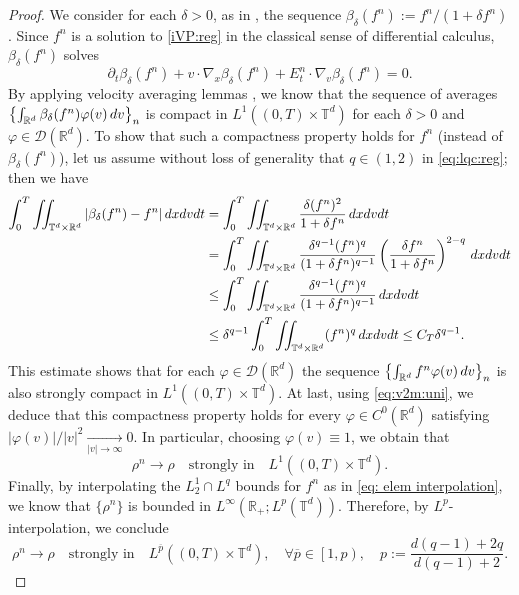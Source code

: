 \documentclass[11pt,reqno,a4paper]{amsart}
\newcommand{\R}{\mathbb{R}}
\newcommand{\p}{\partial}
\newcommand{\iinttr}{\iint_{\T^d\times\R^d}}
\newcommand{\ov}{\overline}
\theoremstyle{definition}
\theoremstyle{remark}
\numberwithin{equation}{section}
\newcommand{\T} {\mathbb T}
\newcommand{\lt}{\left}
\newcommand{\rt}{\right}
\newcommand{\calD}{\mathcal D}
\newcommand{\dx}{\textnormal{d}x}
\newcommand{\dv}{\textnormal{d}v}
\newcommand{\dt}{\textnormal{d}t}
\begin{document}
\begin{proof}
We consider for each $\delta>0$, as in \cite{dipernalions1989a}, the sequence $\beta_\delta(f^n) := f^n/(1+\delta f^n)$. Since $f^n$ is a solution to \eqref{iVP:reg} in the classical sense of differential calculus, $\beta_\delta(f^n)$ solves
\begin{equation}\label{eq:betadelta}
    \p_t \beta_\delta(f^n) + v\cdot \nabla_x \beta_\delta(f^n) + E_t^n \cdot \nabla_v \beta_\delta(f^n) = 0.
\end{equation}
By applying velocity averaging lemmas \cite{DLM91}, we know that the sequence of averages $\lt\{\int_{\R^d} \beta_\delta(f^n) \varphi(v) \,\dv \rt\}_n$ is compact in $L^1((0,T)\times\T^d)$ for each $\delta>0$ and $\varphi\in \calD(\R^d)$. To show that such a compactness property holds for $f^n$ (instead of $\beta_\delta(f^n)$), let us assume without loss of generality that $q\in (1,2)$ in \eqref{eq:lqc:reg}; then we have
\begin{equation} \label{eq: beta app}
\begin{split}
    \int_0^T \iinttr |\beta_\delta(f^n) - f^n| \,\dx\dv\dt      &= \int_0^T \iinttr \frac{ \delta (f^n)^2 }{1 + \delta f^n} \,\dx\dv\dt \\
    &= \int_0^T \iinttr \frac{\delta^{q-1} (f^n)^q  }{(1+\delta f^n)^{q-1}} \lt(\frac{ \delta f^n }{1+\delta f^n}\rt)^{2-q} \,\dx\dv\dt \\
    &\le \int_0^T \iinttr \frac{\delta^{q-1} (f^n)^q  }{(1+\delta f^n)^{q-1}} \,\dx\dv\dt \\
    &\le \delta^{q-1} \int_0^T \iinttr (f^n)^q \,\dx\dv\dt \le C_T \delta^{q-1}.
\end{split}
\end{equation}
This estimate shows that for each $\varphi\in \calD(\R^d)$ the sequence $\lt\{\int_{\R^d} f^n \varphi(v) \,\dv \rt\}_n$ is also strongly compact in $L^1((0,T)\times\T^d)$. At last, using \eqref{eq:v2m:uni}, we deduce that this compactness property holds for every $\varphi\in C^0(\R^d)$ satisfying $|\varphi(v)|/|v|^2 \xrightarrow[|v|\to\infty]{}0$. In particular, choosing $\varphi(v)\equiv 1$, we obtain that
\begin{equation*}
    \rho^n \to \rho \quad \text{strongly in} \quad L^1((0,T)\times\T^d).
\end{equation*}
Finally, by interpolating the $L^1_2 \cap L^q$ bounds for $f^n$ as in \eqref{eq: elem interpolation}, we know that $\{\rho^n\}$ is bounded in $L^\infty(\R_+;L^p(\T^d))$. Therefore, by $L^p$-interpolation, we conclude
\begin{equation*}
    \rho^n \to \rho \quad \text{strongly in} \quad L^{\ov{p}}((0,T)\times \T^d), \quad \forall \ov{p} \in \lt[1, p \rt), \quad p := \frac{d(q-1)+2q}{d(q-1)+2}.
\end{equation*}
\end{proof}
\end{document}
